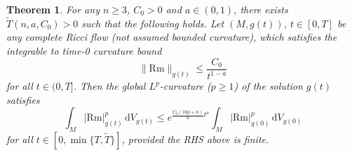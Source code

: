 \documentclass[10pt,a4paper]{amsart}
\newtheorem{thm}{Theorem}
\newcommand{\Rm}{\mathrm{Rm}}
\newcommand{\dV}{\mathrm{d}V}
\begin{document}
    \begin{thm}\label{upperContLp}
        For any $n\geq 3$, $C_0>0$ and $a\in (0,1)$, there exists $\widetilde T(n,a,C_0)>0$ such that the following holds. Let $(M,g(t))$, $t\in [0,T]$ be any complete Ricci flow (not assumed bounded curvature), which satisfies the integrable to time-0 curvature bound
        \begin{equation}\label{integrableCurveBoundLemma}
        \|\Rm\|_{g(t)}\leq \frac{C_0}{t^{1-a}}
        \end{equation}
        for all $t\in (0,T]$. Then the global $L^p$-curvature ($p\geq 1$) of the solution $g(t)$ satisfies
        \[
        \int_M |\mathrm{Rm}|_{g(t)}^p\,\dV_{g(t)}\leq e^{\frac{C_0(16p+n)}{a}t^a}\int_M |\mathrm{Rm}|_{g(0)}^p\,\dV_{g(0)}
        \]
        for all $t\in [0,\min\{T,\widetilde T\}]$, provided the RHS above is finite.
    \end{thm}
\end{document}
